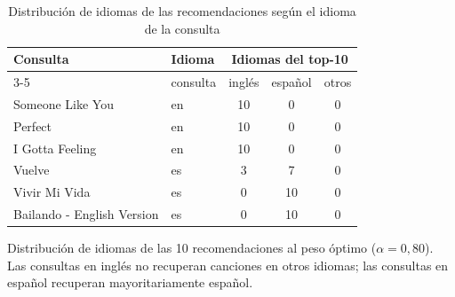\begin{table}[htbp]
  \centering
  \begin{threeparttable}
  \caption{Distribución de idiomas de las recomendaciones según el idioma de la consulta}
  \label{tab:qual_crosslanguage}
  \small
  \begin{tabular}{llccc}
    \toprule
    Consulta & Idioma & \multicolumn{3}{c}{Idiomas del top-10} \\
    \cmidrule(lr){3-5}
     & consulta & inglés & español & otros \\
    \midrule
    Someone Like You & en & 10 & 0 & 0 \\
    Perfect & en & 10 & 0 & 0 \\
    I Gotta Feeling & en & 10 & 0 & 0 \\
    Vuelve & es & 3 & 7 & 0 \\
    Vivir Mi Vida & es & 0 & 10 & 0 \\
    Bailando - English Version & es & 0 & 10 & 0 \\
    \bottomrule
  \end{tabular}
  \begin{tablenotes}[flushleft]
    \small
    \item Distribución de idiomas de las 10 recomendaciones al peso óptimo ($\alpha=0{,}80$). Las consultas en inglés no recuperan canciones en otros idiomas; las consultas en español recuperan mayoritariamente español.
  \end{tablenotes}
  \end{threeparttable}
\end{table}